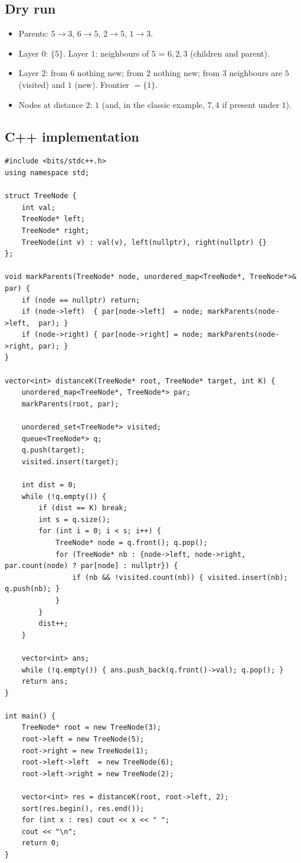 \subsection*{Dry run}


\begin{itemize}
  \item Parents: $5\!\to\!3$, $6\!\to\!5$, $2\!\to\!5$, $1\!\to\!3$.
  \item Layer $0$: $\{5\}$. Layer $1$: neighbours of $5$ = $6,2,3$
        (children and parent).
  \item Layer $2$: from $6$ nothing new; from $2$ nothing new; from $3$
        neighbours are $5$ (visited) and $1$ (new). Frontier $=\{1\}$.
  \item Nodes at distance $2$: $1$ (and, in the classic example, $7,4$ if
        present under $1$).
\end{itemize}

\subsection*{C++ implementation}

\begin{lstlisting}
#include <bits/stdc++.h>
using namespace std;

struct TreeNode {
    int val;
    TreeNode* left;
    TreeNode* right;
    TreeNode(int v) : val(v), left(nullptr), right(nullptr) {}
};

void markParents(TreeNode* node, unordered_map<TreeNode*, TreeNode*>& par) {
    if (node == nullptr) return;
    if (node->left)  { par[node->left]  = node; markParents(node->left,  par); }
    if (node->right) { par[node->right] = node; markParents(node->right, par); }
}

vector<int> distanceK(TreeNode* root, TreeNode* target, int K) {
    unordered_map<TreeNode*, TreeNode*> par;
    markParents(root, par);

    unordered_set<TreeNode*> visited;
    queue<TreeNode*> q;
    q.push(target);
    visited.insert(target);

    int dist = 0;
    while (!q.empty()) {
        if (dist == K) break;
        int s = q.size();
        for (int i = 0; i < s; i++) {
            TreeNode* node = q.front(); q.pop();
            for (TreeNode* nb : {node->left, node->right, par.count(node) ? par[node] : nullptr}) {
                if (nb && !visited.count(nb)) { visited.insert(nb); q.push(nb); }
            }
        }
        dist++;
    }

    vector<int> ans;
    while (!q.empty()) { ans.push_back(q.front()->val); q.pop(); }
    return ans;
}

int main() {
    TreeNode* root = new TreeNode(3);
    root->left = new TreeNode(5);
    root->right = new TreeNode(1);
    root->left->left  = new TreeNode(6);
    root->left->right = new TreeNode(2);

    vector<int> res = distanceK(root, root->left, 2);
    sort(res.begin(), res.end());
    for (int x : res) cout << x << " ";
    cout << "\n";
    return 0;
}
\end{lstlisting}

